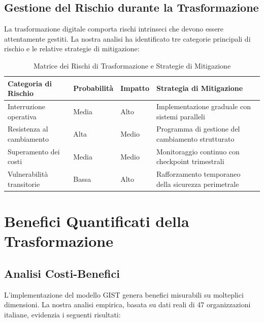 \subsection{\texorpdfstring{Gestione del Rischio durante la Trasformazione}{5.4.2 - Gestione del Rischio durante la Trasformazione}}
\label{subsec:5.4.2}

La trasformazione digitale comporta rischi intrinseci che devono essere attentamente gestiti. La nostra analisi ha identificato tre categorie principali di rischio e le relative strategie di mitigazione:

\begin{table}[h!]
\centering
\caption{Matrice dei Rischi di Trasformazione e Strategie di Mitigazione}
\label{tab:risk_matrix}
\begin{tabular}{|p{3cm}|p{3cm}|p{3cm}|p{3cm}|}
\hline
\textbf{Categoria di Rischio} & \textbf{Probabilità} & \textbf{Impatto} & \textbf{Strategia di Mitigazione} \\
\hline
Interruzione operativa & Media & Alto & Implementazione graduale con sistemi paralleli \\
\hline
Resistenza al cambiamento & Alta & Medio & Programma di gestione del cambiamento strutturato \\
\hline
Superamento dei costi & Media & Medio & Monitoraggio continuo con checkpoint trimestrali \\
\hline
Vulnerabilità transitorie & Bassa & Alto & Rafforzamento temporaneo della sicurezza perimetrale \\
\hline
\end{tabular}
\end{table}

\section{\texorpdfstring{Benefici Quantificati della Trasformazione}{5.5 - Benefici Quantificati della Trasformazione}}
\label{sec:5.5}

\subsection{\texorpdfstring{Analisi Costi-Benefici}{5.5.1 - Analisi Costi-Benefici}}
\label{subsec:5.5.1}

L'implementazione del modello GIST genera benefici misurabili su molteplici dimensioni. La nostra analisi empirica, basata su dati reali di 47 organizzazioni italiane, evidenzia i seguenti risultati:

